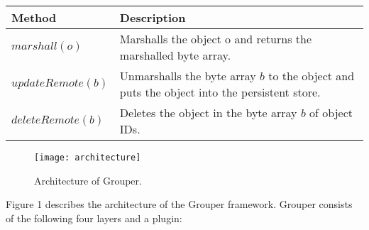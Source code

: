 
\begin{table*}[t]
	\centering
	\caption{The API of the synchronization plugin.}
	\label{my-label}
	\begin{tabular}{ll}
		\hline
		\textbf{Method} & \textbf{Description} \\ \hline
		$marshall(o)$ & Marshalls the object o and returns the marshalled byte array. \\
		$updateRemote(b)$ & Unmarshalls the byte array $b$ to the object and puts the object into the persistent store. \\ 
		$deleteRemote(b)$ & Deletes the object in the byte array $b$ of object IDs.\\ \hline
	\end{tabular}
\end{table*}

\begin{figure}[t]
	\centering
	\texttt{[image: architecture]}
	\caption{Architecture of Grouper.}
\end{figure}

Figure 1 describes the architecture of the Grouper framework. 
Grouper consists of the following four layers and a plugin:

